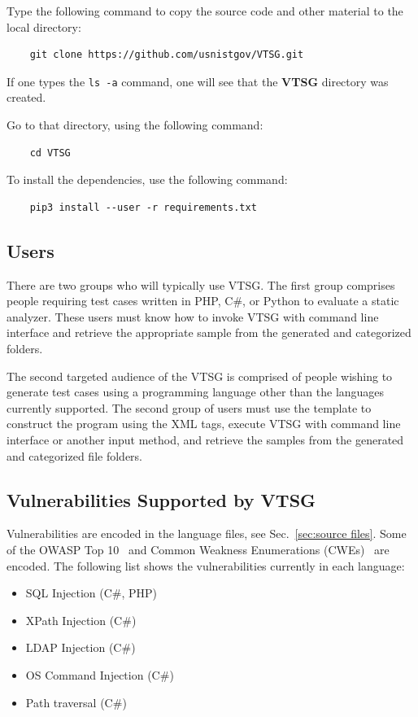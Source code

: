 \documentclass[12pt]{article}
\newcommand{\CSharp}{C{\fontseries{b}\selectfont\#}}
\begin{document}
\noindent Type the following command to copy the source code and other material to the local directory:

\begin{verbatim}
    git clone https://github.com/usnistgov/VTSG.git
\end{verbatim}

\noindent If one types the \verb|ls -a| command, one will see that the \textbf{VTSG} directory was created.

\noindent Go to that directory, using the following command:

\begin{verbatim}
    cd VTSG
\end{verbatim}

\noindent To install the dependencies, use the following command:

\begin{verbatim}
    pip3 install --user -r requirements.txt
\end{verbatim}


\subsection{Users}

There are two groups who will typically use VTSG. The first group comprises people
requiring test cases written in PHP, \CSharp, or Python to evaluate a static
analyzer. These users must know how to invoke VTSG with command line interface and
retrieve the appropriate sample from the generated and categorized folders.

The second targeted audience of the VTSG is comprised of people wishing to generate
test cases using a programming language other than the languages currently
supported. The second group of users must use the template to construct the program
using the XML tags, execute VTSG with command line interface or another input method,
and retrieve the samples from the generated and categorized file folders.

\subsection{Vulnerabilities Supported by VTSG}

Vulnerabilities are encoded in the language files, see Sec.~\ref{sec:source files}.
Some of the OWASP Top 10~\cite{OWASPTop10-2017} and
Common Weakness Enumerations (CWEs)~\cite{CWE} are encoded.  The following list shows
the vulnerabilities currently in each language:
\begin{itemize}
    \item SQL Injection (\CSharp, PHP)
    \item XPath Injection (\CSharp)
    \item LDAP Injection (\CSharp)
    \item OS Command Injection (\CSharp)
    \item Path traversal (\CSharp)
\end{itemize}
\end{document}
